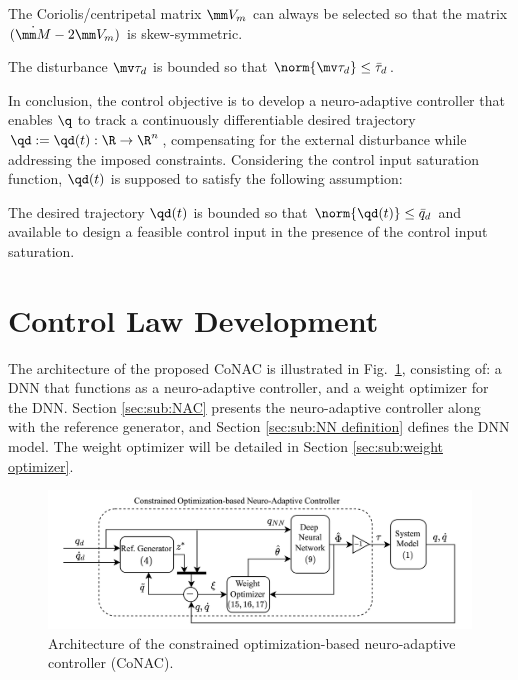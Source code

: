 \documentclass[lettersize,journal]{IEEEtran}
\begin{document}
\begin{prop} \cite{Lewis:1998aa}
    The Coriolis/centripetal matrix $\mm V_m$ can always be selected so that the matrix $(\dot{\mm M}-2\mm V_m)$ is skew-symmetric.
    \label{prop:skew}
\end{prop}

\begin{prop}
    The disturbance $\mv\tau_d$ is bounded so that $\norm{\mv\tau_d}\le \bar\tau_d$.
    \label{prop:dis_bound}
\end{prop}

In conclusion, the control objective is to develop a neuro-adaptive controller that enables $\q$ to track a continuously differentiable desired trajectory $\qd:=\qd(t): \R \to \R^n$, compensating for the external disturbance while addressing the imposed constraints.
Considering the control input saturation function, $\qd(t)$ is supposed to satisfy the following assumption:
\begin{assum}
    The desired trajectory $\qd(t)$ is bounded so that $\norm{\qd(t)}\le \bar{q}_d$ and available to design a feasible control input in the presence of the control input saturation.
    \label{assum:feasible}
\end{assum}

\section{Control Law Development}\label{sec:ctrl design}

The architecture of the proposed CoNAC is illustrated in Fig.~\ref{fig:ctrl:diagram}, consisting of: a DNN that functions as a neuro-adaptive controller, and a weight optimizer for the DNN. 
Section \ref{sec:sub:NAC} presents the neuro-adaptive controller along with the reference generator, and Section \ref{sec:sub:NN definition} defines the DNN model. The weight optimizer will be detailed in Section \ref{sec:sub:weight optimizer}.

\begin{figure}[!t]
    \centering
    \includegraphics[width=0.7\linewidth]{fig/Controller.drawio.png}
    \caption{Architecture of the constrained optimization-based neuro-adaptive controller (CoNAC).}
    \label{fig:ctrl:diagram}
\end{figure}
\end{document}
